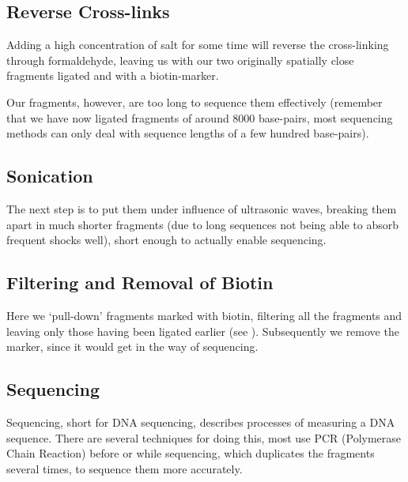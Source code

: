 \subsection{Reverse Cross-links}\label{sec:revcrosslink}

Adding a high concentration of salt for some time will reverse the
cross-linking through formaldehyde, leaving us with our two originally
spatially close fragments ligated and with a biotin-marker.

Our fragments, however, are too long to sequence them effectively (remember
that we have now ligated fragments of around 8000 base-pairs, most sequencing
methods can only deal with sequence lengths of a few hundred base-pairs).

\subsection{Sonication}\label{sec:sonication}

The next step is to put them under influence of ultrasonic waves, breaking them
apart in much shorter fragments (due to long sequences not being able to absorb
frequent shocks well), short enough to actually enable sequencing.

\subsection{Filtering and Removal of Biotin}\label{sec:pulldown}

Here we `pull-down' fragments marked with biotin, filtering all the fragments
and leaving only those having been ligated earlier (see ).
Subsequently we remove the marker, since it would get in the way of sequencing.

\subsection{Sequencing}\label{sec:sequencing}

Sequencing, short for DNA sequencing, describes processes of measuring a DNA
sequence. There are several techniques for doing this, most use PCR (Polymerase
Chain Reaction) before or while sequencing, which duplicates the fragments
several times, to sequence them more accurately.




